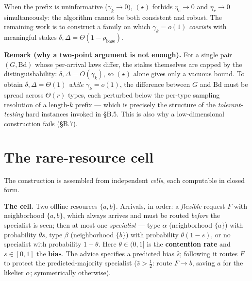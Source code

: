 When the prefix is uninformative (\(\gamma_k\to0\)), \((\star)\) forbids
\(\eta_c\to0\) and \(\eta_r\to0\) simultaneously: the algorithm cannot
be both consistent and robust. The remaining work is to construct a
family on which \(\gamma_k=o(1)\) \emph{coexists} with meaningful stakes
\(\delta,\Delta=\Theta(1-\rho_{\mathrm{base}})\).

\textbf{Remark (why a two-point argument is not enough).} For a single
pair \((G,\mathrm{Bd})\) whose per-arrival laws differ, the stakes
themselves are capped by the distinguishability:
\(\delta,\Delta = O(\gamma_k)\), so \((\star)\) alone gives only a
vacuous bound. To obtain \(\delta,\Delta=\Theta(1)\) \emph{while}
\(\gamma_k=o(1)\), the difference between \(G\) and \(\mathrm{Bd}\) must
be spread across \(\Theta(r)\) types, each perturbed below the per-type
sampling resolution of a length-\(k\) prefix --- which is precisely the
structure of the \emph{tolerant-testing} hard instances invoked in §B.5.
This is also why a low-dimensional construction fails (§B.7).

\section{The rare-resource cell}

The construction is assembled from independent \emph{cells}, each
computable in closed form.

\textbf{The cell.} Two offline resources \(\{a,b\}\). Arrivals, in
order: a \emph{flexible} request \(F\) with neighborhood \(\{a,b\}\),
which always arrives and must be routed \emph{before} the specialist is
seen; then at most one \emph{specialist} --- type \(\alpha\)
(neighborhood \(\{a\}\)) with probability \(\theta s\), type \(\beta\)
(neighborhood \(\{b\}\)) with probability \(\theta(1-s)\), or no
specialist with probability \(1-\theta\). Here \(\theta\in(0,1]\) is the
\textbf{contention rate} and \(s\in[0,1]\) the \textbf{bias}. The advice
specifies a predicted bias \(\hat s\); following it routes \(F\) to
protect the predicted-majority specialist (\(\hat s>\tfrac12\): route
\(F\to b\), saving \(a\) for the likelier \(\alpha\); symmetrically
otherwise).

